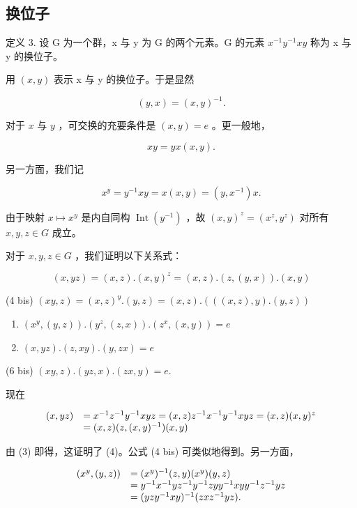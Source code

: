 \subsection{换位子}

定义 3. 设 G 为一个群，x 与 y 为 G 的两个元素。G 的元素 \(x^{-1}y^{-1}xy\) 称为 x 与 y 的换位子。

用 \((x,y)\) 表示 x 与 y 的换位子。于是显然

\[
(y, x) = (x, y) ^ {- 1}.
\]

对于 \(x\) 与 \(y\) ，可交换的充要条件是 \((x, y) = e\) 。更一般地，

\[
x y = y x (x, y).
\]

另一方面，我们记

\[
x ^ {y} = y ^ {- 1} x y = x (x, y) = (y, x ^ {- 1}) x.\tag{3}
\]

由于映射 \(x \mapsto x^y\) 是内自同构 \(\operatorname{Int}(y^{-1})\) ，故 \((x, y)^z = (x^z, y^z)\) 对所有 \(x, y, z \in G\) 成立。

对于 \(x, y, z \in G\) ，我们证明以下关系式：

\[
(x, y z) = (x, z). (x, y) ^ {z} = (x, z). (z, (y, x)). (x, y)\tag{4}
\]

(4 bis) \((xy,z) = (x,z)^y.(y,z) = (x,z).(((x,z),y).(y,z))\)

\begin{enumerate}
\def\labelenumi{(\arabic{enumi})}
\setcounter{enumi}{4}
\item
  \((x^{y}, (y, z)).(y^{z}, (z, x)).(z^{x}, (x, y)) = e\)
\item
  \((x, yz).(z, xy).(y, zx) = e\)
\end{enumerate}

(6 bis) \((xy, z). (yz, x). (zx, y) = e.\)

现在

\[
\begin{array}{r l} (x, y z) & = x ^ {- 1} z ^ {- 1} y ^ {- 1} x y z = (x, z) z ^ {- 1} x ^ {- 1} y ^ {- 1} x y z = (x, z) (x, y) ^ {z} \\ & = (x, z) (z, (x, y) ^ {- 1}) (x, y) \end{array}
\]

由 (3) 即得，这证明了 (4)。公式 (4 bis) 可类似地得到。另一方面，

\[
\begin{array}{r l} (x ^ {y}, (y, z)) & = (x ^ {y}) ^ {- 1} (z, y) (x ^ {y}) (y, z) \\ & = y ^ {- 1} x ^ {- 1} y z ^ {- 1} y ^ {- 1} z y y ^ {- 1} x y y ^ {- 1} z ^ {- 1} y z \\ & = (y z y ^ {- 1} x y) ^ {- 1} (z x z ^ {- 1} y z). \end{array}
\]

